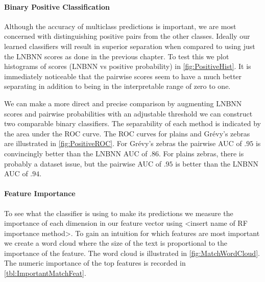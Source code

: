         \paragraph{Binary Positive Classification}
        Although the accuracy of multiclass predictions is important, we are
          most concerned with distinguishing positive pairs from the other
          classes.
        Ideally our learned classifiers will result in superior separation
          when compared to using just the LNBNN scores as done in the previous
          chapter.
        To test this we plot histograms of scores (LNBNN vs positive
          probability) in \cref{fig:PositiveHist}.
        It is immediately noticeable that the pairwise scores seem to have a
          much better separating in addition to being in the interpretable range
          of zero to one.


        \PositiveHist{}

        We can make a more direct and precise comparison by augmenting LNBNN
          scores and pairwise probabilities with an adjustable threshold we can
          construct two comparable binary classifiers.
        The separability of each method is indicated by the area under the ROC
          curve.
        The ROC curves for plains and Grévy's zebras are illustrated in
          \cref{fig:PositiveROC}.
        For Grévy's zebras the pairwise AUC of $.95$ is convincingly better
          than the LNBNN AUC of $.86$.
        For plains zebras, there is probably a dataset issue, but the pairwise
          AUC of $.95$ is better than the LNBNN AUC of $.94$.

        \PositiveROC{}


        \paragraph{Feature Importance}
        To see what the classifier is using to make its predictions we measure the
        importance of each dimension in our feature vector using <insert name of RF
        importance method>. To gain an intuition for which features are most important
        we create a word cloud where the size of the text is proportional to the
        importance of the feature. The word cloud is illustrated in
        \cref{fig:MatchWordCloud}. The numeric importance of the top features is
        recorded in \cref{tbl:ImportantMatchFeat}.

